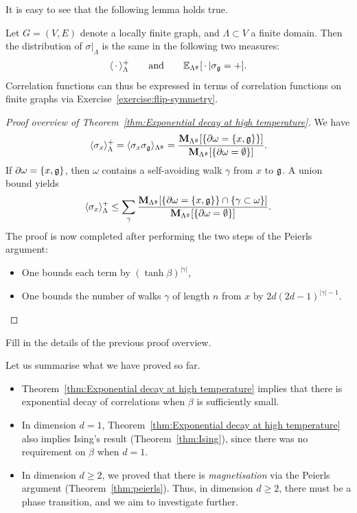 It is easy to see that the following lemma holds true.

\begin{lemma}
    \label{lemma:ghost}
    Let $G=(V,E)$ denote a locally finite graph,
    and $\Lambda\subset V$ a finite domain.
    Then the distribution of $\sigma|_{\Lambda}$ is the same in the following
    two measures:
    \[
        \langle\blank\rangle_{\Lambda}^+
        \qquad\text{and}\qquad
        \E_{\Lambda^\frakg}[\blank|\sigma_\frakg=+].
    \]
    Correlation functions can thus be expressed in terms of correlation functions
    on finite graphs via Exercise~\ref{exercise:flip-symmetry}.
\end{lemma}

\begin{proof}[Proof overview of Theorem~\ref{thm:Exponential decay at high temperature}]
    We have
    \[
        \langle\sigma_x\rangle_{\Lambda}^+
        =
        \langle\sigma_x\sigma_\mathfrak g\rangle_{\Lambda^\mathfrak g}
        =
        \frac{
            \mathbf{M}_{\Lambda^\mathfrak g}[\{\partial\omega=\{x,\mathfrak g\}\}]
        }{
            \mathbf{M}_{\Lambda^\mathfrak g}[\{\partial\omega=\emptyset\}]
        }.
    \]
    If $\partial\omega=\{x,\mathfrak g\}$, then $\omega$ contains a self-avoiding
    walk $\gamma$ from $x$ to $\mathfrak g$.
    A union bound yields
    \[
        \langle\sigma_x\rangle_{\Lambda}^+
        \leq
        \sum_{\gamma}\frac{\mathbf{M}_{\Lambda^\mathfrak g}[\{\partial\omega=\{x,\mathfrak g\}\}\cap\{\gamma\subset\omega\}]}{\mathbf{M}_{\Lambda^\mathfrak g}[\{\partial\omega=\emptyset\}]}.
    \]
    The proof is now completed after performing the two steps of the Peierls argument:
    \begin{itemize}
        \item One bounds each term by $(\tanh\beta)^{|\gamma|}$,
        \item One bounds the number of walks $\gamma$ of length $n$ from $x$ by
            $2d(2d-1)^{|\gamma|-1}$.
    \end{itemize}
    \qedhere
\end{proof}

\begin{exercise}
    Fill in the details of the previous proof overview.
\end{exercise}

Let us summarise what we have proved so far.
\begin{itemize}
    \item Theorem~\ref{thm:Exponential decay at high temperature}
        implies that there is exponential decay of correlations when $\beta$ is sufficiently small.
    \item In dimension $d=1$, Theorem~\ref{thm:Exponential decay at high temperature}
        also implies Ising's result (Theorem~\ref{thm:Ising}),
        since there was no requirement on $\beta$ when $d=1$.
    \item In dimension $d\geq 2$, we proved that there is \emph{magnetisation} via the
        Peierls argument (Theorem~\ref{thm:peierls}).
        Thus, in dimension $d\geq 2$, there must be a phase transition,
        and we aim to investigate further.
\end{itemize}

